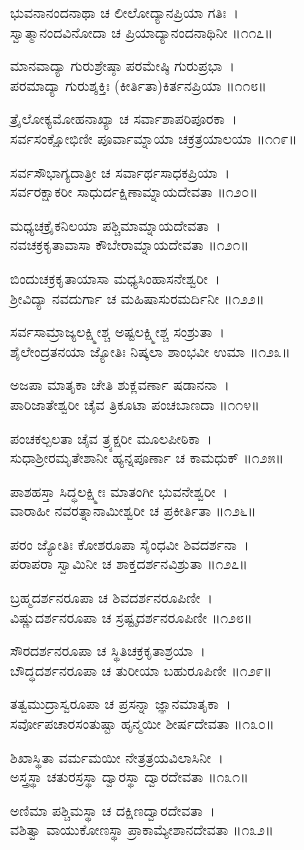 ಭುವನಾನಂದನಾಥಾ ಚ ಲೀಲೋದ್ಯಾನಪ್ರಿಯಾ ಗತಿಃ~।\\
ಸ್ವಾತ್ಮಾನಂದವಿನೋದಾ ಚ ಪ್ರಿಯಾದ್ಯಾನಂದನಾಥಿನೀ ॥೧೧೭॥

	ಮಾನವಾದ್ಯಾ ಗುರುಶ್ರೇಷ್ಠಾ ಪರಮೇಷ್ಠಿ ಗುರುಪ್ರಭಾ~।\\
	ಪರಮಾದ್ಯಾ ಗುರುಶ್ಶಕ್ತಿಃ (ಕೀರ್ತಿತಾ)ಕಿರ್ತನಪ್ರಿಯಾ ॥೧೧೮॥

ತ್ರೈಲೋಕ್ಯಮೋಹನಾಖ್ಯಾ ಚ ಸರ್ವಾಶಾಪರಿಪೂರಕಾ~।\\
ಸರ್ವಸಂಕ್ಷೋಭಿಣೀ ಪೂರ್ವಾಮ್ನಾಯಾ ಚಕ್ರತ್ರಯಾಲಯಾ ॥೧೧೯॥

	ಸರ್ವಸೌಭಾಗ್ಯದಾತ್ರೀ ಚ ಸರ್ವಾರ್ಥಸಾಧಕಪ್ರಿಯಾ~।\\
	ಸರ್ವರಕ್ಷಾಕರೀ ಸಾಧುರ್ದಕ್ಷಿಣಾಮ್ನಾಯದೇವತಾ ॥೧೨೦॥

ಮಧ್ಯಚಕ್ರೈಕನಿಲಯಾ ಪಶ್ಚಿಮಾಮ್ನಾಯದೇವತಾ~।\\
ನವಚಕ್ರಕೃತಾವಾಸಾ ಕೌಬೇರಾಮ್ನಾಯದೇವತಾ ॥೧೨೧॥

	ಬಿಂದುಚಕ್ರಕೃತಾಯಾಸಾ ಮಧ್ಯಸಿಂಹಾಸನೇಶ್ವರೀ~।\\
	ಶ್ರೀವಿದ್ಯಾ ನವದುರ್ಗಾ ಚ ಮಹಿಷಾಸುರಮರ್ದಿನೀ ॥೧೨೨॥

ಸರ್ವಸಾಮ್ರಾಜ್ಯಲಕ್ಷ್ಮೀಶ್ಚ ಅಷ್ಟಲಕ್ಷ್ಮೀಶ್ಚ ಸಂಶ್ರುತಾ~।\\
ಶೈಲೇಂದ್ರತನಯಾ ಜ್ಯೋತಿಃ ನಿಷ್ಕಲಾ ಶಾಂಭವೀ ಉಮಾ ॥೧೨೩॥

	ಅಜಪಾ ಮಾತೃಕಾ ಚೇತಿ ಶುಕ್ಲವರ್ಣಾ ಷಡಾನನಾ~।\\
	ಪಾರಿಜಾತೇಶ್ವರೀ ಚೈವ ತ್ರಿಕೂಟಾ ಪಂಚಬಾಣದಾ ॥೧೧೪॥

ಪಂಚಕಲ್ಪಲತಾ ಚೈವ ತ್ರ್ಯಕ್ಷರೀ ಮೂಲಪೀಠಿಕಾ~।\\
ಸುಧಾಶ್ರೀರಮೃತೇಶಾನೀ ಹ್ಯನ್ನಪೂರ್ಣಾ ಚ ಕಾಮಧುಕ್ ॥೧೨೫॥

	ಪಾಶಹಸ್ತಾ ಸಿದ್ಧಲಕ್ಷ್ಮೀಃ ಮಾತಂಗೀ ಭುವನೇಶ್ವರೀ~।\\
	ವಾರಾಹೀ ನವರತ್ನಾನಾಮೀಶ್ವರೀ ಚ ಪ್ರಕೀರ್ತಿತಾ ॥೧೨೬॥

ಪರಂ ಜ್ಯೋತಿಃ ಕೋಶರೂಪಾ ಸೈಂಧವೀ ಶಿವದರ್ಶನಾ~।\\
ಪರಾಪರಾ ಸ್ವಾಮಿನೀ ಚ ಶಾಕ್ತದರ್ಶನವಿಶ್ರುತಾ ॥೧೨೭॥

	ಬ್ರಹ್ಮದರ್ಶನರೂಪಾ ಚ ಶಿವದರ್ಶನರೂಪಿಣೀ~।\\
	ವಿಷ್ಣುದರ್ಶನರೂಪಾ ಚ ಸ್ರಷ್ಟೃದರ್ಶನರೂಪಿಣೀ ॥೧೨೮॥

ಸೌರದರ್ಶನರೂಪಾ ಚ ಸ್ಥಿತಿಚಕ್ರಕೃತಾಶ್ರಯಾ~।\\
ಬೌದ್ಧದರ್ಶನರೂಪಾ ಚ ತುರೀಯಾ ಬಹುರೂಪಿಣೀ ॥೧೨೯॥

	ತತ್ವಮುದ್ರಾಸ್ವರೂಪಾ ಚ ಪ್ರಸನ್ನಾ ಜ್ಞಾನಮಾತೃಕಾ~।\\
	ಸರ್ವೋಪಚಾರಸಂತುಷ್ಟಾ ಹೃನ್ಮಯೀ ಶೀರ್ಷದೇವತಾ ॥೧೩೦॥

ಶಿಖಾಸ್ಥಿತಾ ವರ್ಮಮಯೀ ನೇತ್ರತ್ರಯವಿಲಾಸಿನೀ~।\\
ಅಸ್ತ್ರಸ್ಥಾ ಚತುರಸ್ರಸ್ಥಾ ದ್ವಾರಸ್ಥಾ ದ್ವಾರದೇವತಾ ॥೧೩೧॥

	ಅಣಿಮಾ ಪಶ್ಚಿಮಸ್ಥಾ ಚ ದಕ್ಷಿಣದ್ವಾರದೇವತಾ~।\\
	ವಶಿತ್ವಾ ವಾಯುಕೋಣಸ್ಥಾ ಪ್ರಾಕಾಮ್ಯೇಶಾನದೇವತಾ ॥೧೩೨॥

